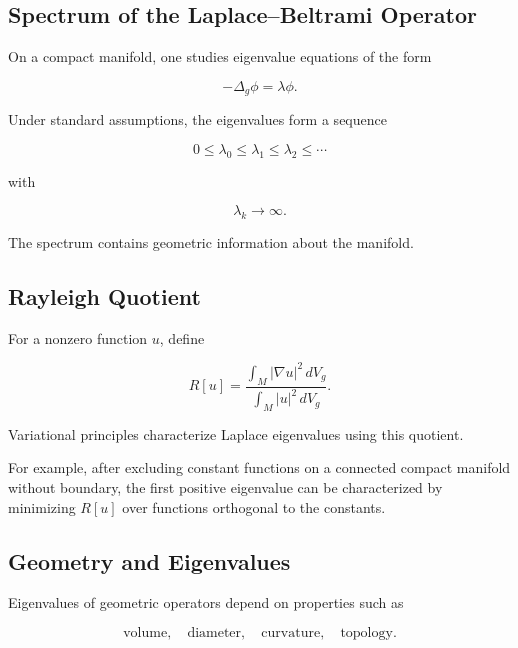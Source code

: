 \subsection{Spectrum of the Laplace--Beltrami Operator}
\label{subsec:laplace-beltrami-spectrum}

On a compact manifold, one studies eigenvalue equations of the form

\[
\boxed{
-\Delta_g\phi
=
\lambda\phi.
}
\]

Under standard assumptions, the eigenvalues form a sequence

\[
\boxed{
0\leq
\lambda_0
\leq
\lambda_1
\leq
\lambda_2
\leq
\cdots
}
\]

with

\[
\lambda_k\to\infty.
\]

The spectrum contains geometric information about the manifold.

\subsection{Rayleigh Quotient}
\label{subsec:geometric-rayleigh-quotient}

For a nonzero function \(u\), define

\[
\boxed{
R[u]
=
\frac{
\int_M|\nabla u|^2\,dV_g
}{
\int_M|u|^2\,dV_g
}.
}
\]

Variational principles characterize Laplace eigenvalues using this
quotient.

For example, after excluding constant functions on a connected compact
manifold without boundary, the first positive eigenvalue can be
characterized by minimizing \(R[u]\) over functions orthogonal to the
constants.

\subsection{Geometry and Eigenvalues}
\label{subsec:geometry-eigenvalues}

Eigenvalues of geometric operators depend on properties such as

\[
\boxed{
\text{volume},
\quad
\text{diameter},
\quad
\text{curvature},
\quad
\text{topology}.
}
\]

